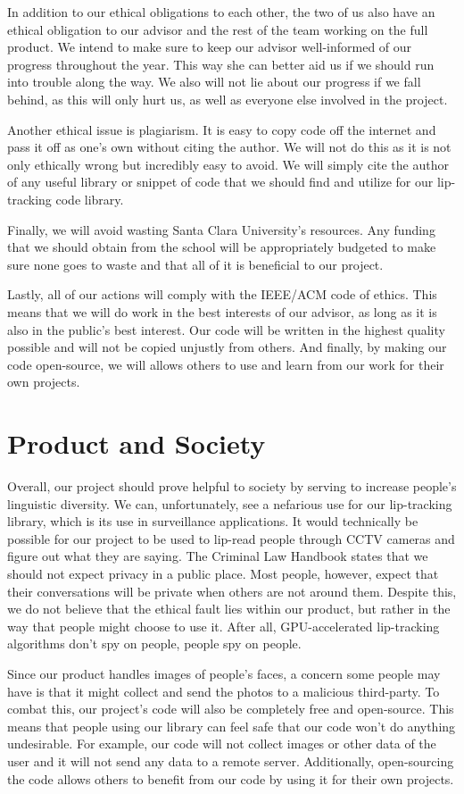 In addition to our ethical obligations to each other, the two of us also have an ethical obligation to our advisor and the rest of the team working on the full product. We intend to make sure to keep our advisor well-informed of our progress throughout the year. This way she can better aid us if we should run into trouble along the way. We also will not lie about our progress if we fall behind, as this will only hurt us, as well as everyone else involved in the project.

Another ethical issue is plagiarism. It is easy to copy code off the internet and pass it off as one's own without citing the author. We will not do this as it is not only ethically wrong but incredibly easy to avoid. We will simply cite the author of any useful library or snippet of code that we should find and utilize for our lip-tracking code library.

Finally, we will avoid wasting Santa Clara University's resources. Any funding that we should obtain from the school will be appropriately budgeted to make sure none goes to waste and that all of it is beneficial to our project.

Lastly, all of our actions will comply with the IEEE/ACM code of ethics. This means that we will do work in the best interests of our advisor, as long as it is also in the public's best interest. Our code will be written in the highest quality possible and will not be copied unjustly from others. And finally, by making our code open-source, we will allows others to use and learn from our work for their own projects. 


\section{Product and Society}
Overall, our project should prove helpful to society by serving to increase people's linguistic diversity. We can, unfortunately, see a nefarious use for our lip-tracking library, which is its use in surveillance applications. It would technically be possible for our project to be used to lip-read people through CCTV cameras and figure out what they are saying. The Criminal Law Handbook states that we should not expect privacy in a public place. Most people, however, expect that their conversations will be private when others are not around them. Despite this, we do not believe that the ethical fault lies within our product, but rather in the way that people might choose to use it. After all, GPU-accelerated lip-tracking algorithms don't spy on people, people spy on people. 

Since our product handles images of people's faces, a concern some people may have is that it might collect and send the photos to a malicious third-party. To combat this, our project's code will also be completely free and open-source. This means that people using our library can feel safe that our code won't do anything undesirable. For example, our code will not collect images or other data of the user and it will not send any data to a remote server. Additionally, open-sourcing the code allows others to benefit from our code by using it for their own projects.
